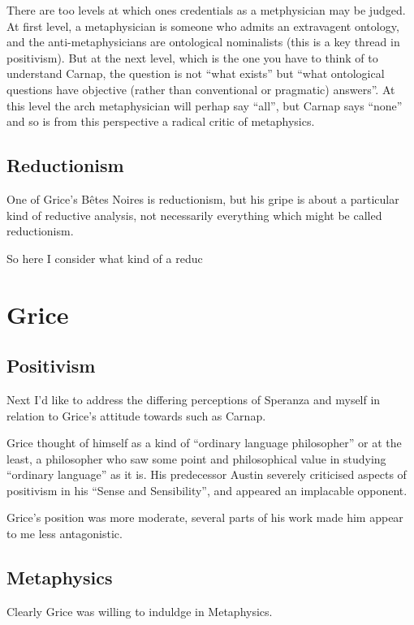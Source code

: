 \documentclass{article}
\begin{document}
There are too levels at which ones credentials as a metphysician may be judged.
At first level, a metaphysician is someone who admits an extravagent ontology, and the anti-metaphysicians are ontological nominalists (this is a key thread in positivism).
But at the next level, which is the one you have to think of to understand Carnap, the question is not ``what exists'' but ``what ontological questions have objective (rather than conventional or pragmatic) answers''.
At this level the arch metaphysician will perhap say ``all'', but Carnap says ``none'' and so is from this perspective a radical critic of metaphysics.

\subsection{Reductionism}

One of Grice's B\^etes Noires is reductionism, but his gripe is about a particular kind of reductive analysis, not necessarily everything which might be called reductionism.

So here I consider what kind of a reduc

\section{Grice}

\subsection{Positivism}

Next I'd like to address the differing perceptions of Speranza and myself in relation to Grice's attitude towards such as Carnap.

Grice thought of himself as a kind of ``ordinary language philosopher'' or at the least, a philosopher who saw some point and philosophical value in studying ``ordinary language'' as it is.
His predecessor Austin severely criticised aspects of positivism in his ``Sense and Sensibility'', and appeared an implacable opponent.

Grice's position was more moderate, several parts of his work made him appear to me less antagonistic.

\subsection{Metaphysics}

Clearly Grice was willing to induldge in Metaphysics.
\end{document}
